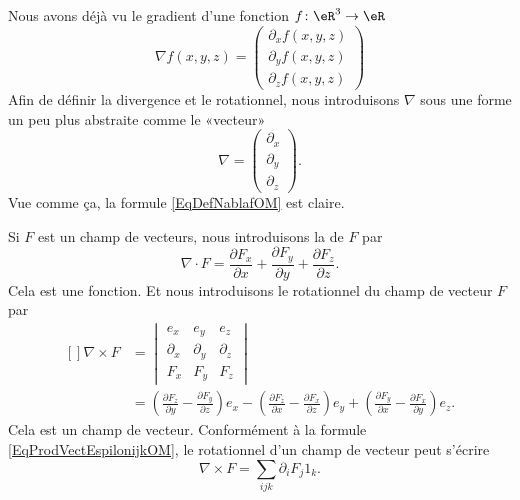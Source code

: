 Nous avons déjà vu le gradient d'une fonction $f\colon \eR^3\to \eR$
\begin{equation}        \label{EqDefNablafOM}
    \nabla f(x,y,z)=\begin{pmatrix}
        \partial_xf(x,y,z)    \\ 
        \partial_yf(x,y,z)    \\ 
        \partial_zf(x,y,z)    
    \end{pmatrix}
\end{equation}
Afin de définir la divergence et le rotationnel, nous introduisons $\nabla$ sous une forme un peu plus abstraite comme le «vecteur»
\begin{equation}
    \nabla=\begin{pmatrix}
        \partial_x    \\ 
        \partial_y    \\ 
        \partial_z
    \end{pmatrix}.
\end{equation}
Vue comme ça, la formule \eqref{EqDefNablafOM} est claire.

Si $F$ est un champ de vecteurs, nous introduisons la  de $F$ par
\begin{equation}
    \nabla\cdot F=\frac{ \partial F_x }{ \partial x }+\frac{ \partial F_y }{ \partial y }+\frac{ \partial F_z }{ \partial z }.
\end{equation}
Cela est une fonction. Et nous introduisons le rotationnel du champ de vecteur $F$ par
\begin{equation}
    \begin{aligned}[]
        \nabla\times F&=\begin{vmatrix}
              e_x  &   e_y    &   e_z    \\
            \partial_x    &   \partial_y    &   \partial_z    \\
            F_x    &   F_y    &   F_z
        \end{vmatrix}\\
        &=
        \left( \frac{ \partial F_z }{ \partial y }-\frac{ \partial F_y }{ \partial z } \right)e_x
        -\left( \frac{ \partial F_z }{ \partial x }-\frac{ \partial F_x }{ \partial z } \right)e_y
        +\left( \frac{ \partial F_y }{ \partial x }-\frac{ \partial F_x }{ \partial y } \right)e_z.
    \end{aligned}
\end{equation}
Cela est un champ de vecteur. Conformément à la formule \eqref{EqProdVectEspilonijkOM}, le rotationnel d'un champ de vecteur peut s'écrire
\begin{equation}
    \nabla\times F=\sum_{ijk}\partial_i F_j 1_k.
\end{equation}

